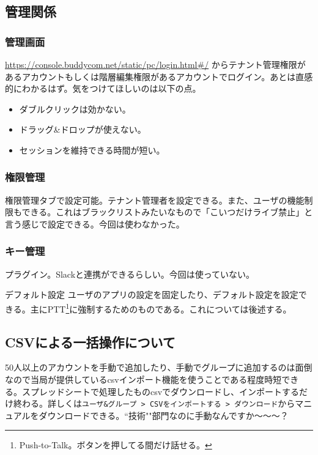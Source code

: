 \documentclass[a4paper]{ltjsreport}
\newcommand{\terlogy}[2][|]{\colorbox{terlogy}{\texttt{\lstinline#1#2#1}}}
\begin{document}
\subsection{管理関係}
\subsubsection{管理画面}
\url{https://console.buddycom.net/static/pc/login.html#/} からテナント管理権限があるアカウントもしくは階層編集権限があるアカウントでログイン。あとは直感的にわかるはず。気をつけてほしいのは以下の点。

\begin{itemize}
  \item ダブルクリックは効かない。
  \item ドラッグ\&ドロップが使えない。
  \item セッションを維持できる時間が短い。
\end{itemize}

\subsubsection{権限管理}
権限管理タブで設定可能。テナント管理者を設定できる。また、ユーザの機能制限もできる。これはブラックリストみたいなもので「こいつだけライブ禁止」と言う感じで設定できる。今回は使わなかった。

\subsubsection{キー管理}
プラグイン。Slackと連携ができるらしい。今回は使っていない。

{デフォルト設定}
ユーザのアプリの設定を固定したり、デフォルト設定を設定できる。主にPTT\footnote{Push-to-Talk。ボタンを押してる間だけ話せる。}に強制するためのものである。これについては後述する。


\subsection{CSVによる一括操作について}
50人以上のアカウントを手動で追加したり、手動でグループに追加するのは面倒なので当局が提供しているcsvインポート機能を使うことである程度時短できる。スプレッドシートで処理したものcsvでダウンロードし、インポートするだけ終わる。詳しくは\terlogy{ユーザ&グループ > CSVをインポートする > ダウンロード}からマニュアルをダウンロードできる。``技術""部門なのに手動なんですか〜〜〜？
\end{document}
